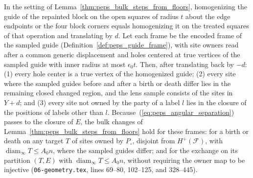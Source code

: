 \begin{lemma}
    \label{thm:peps_bulk_steps_treated_frames}
    \leanok
    In the setting of Lemma~\ref{thm:peps_bulk_steps_from_floors}, homogenizing
    the guide of the repainted block on the open squares of radius $t$ about the
    edge endpoints or the four block corners equals
    homogenizing it on the treated squares of that operation and translating by $d$. Let each frame be the encoded frame of the sampled guide (Definition~\ref{def:peps_guide_frame}), with site owners read after a common generic
    displacement and holes centered at true vertices of the
    sampled guide with inner radius at most $\epsilon_0t$. Then, after translating back by $-d$:
    (1) every hole center is a true vertex of the homogenized guide;
    (2) every site where the sampled guides before and after a birth or death differ lies in the remaining closed changed region, and the lens sample consists of the sites in $Y+d$; and
    (3) every site not owned by the party of a label $l$ lies in the closure of the positions of labels other than $l$.
    Because~(\ref{eq:peps_angular_separation}) passes to the closure of $E$, the bulk
    changes of Lemma~\ref{thm:peps_bulk_steps_from_floors} hold for these
    frames: for a birth or death on any target $T$ of sites owned
    by $P_\circ$, disjoint from $H^+(\mathcal F)$, with $\operatorname{diam}_\infty T\le A_0n$, where the sampled guides differ; and for the
    exchange on its partition $(T,E)$ with $\operatorname{diam}_\infty T\le A_0n$, without requiring the owner map to be injective (\texttt{06-geometry.tex}, lines 69--80, 102--125, and 328--445).
\end{lemma}

